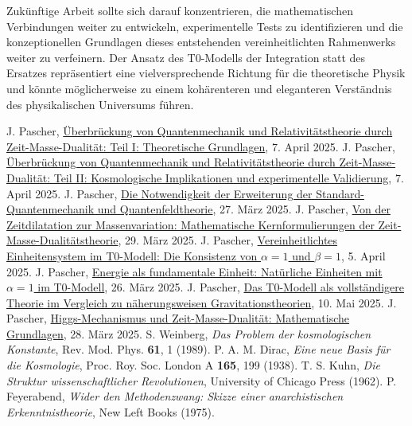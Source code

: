 \documentclass[12pt,a4paper]{article}
\begin{document}
	Zukünftige Arbeit sollte sich darauf konzentrieren, die mathematischen Verbindungen weiter zu entwickeln, experimentelle Tests zu identifizieren und die konzeptionellen Grundlagen dieses entstehenden vereinheitlichten Rahmenwerks weiter zu verfeinern. Der Ansatz des T0-Modells der Integration statt des Ersatzes repräsentiert eine vielversprechende Richtung für die theoretische Physik und könnte möglicherweise zu einem kohärenteren und eleganteren Verständnis des physikalischen Universums führen.
	
	\begin{thebibliography}{99}
		 J. Pascher, \href{https://github.com/jpascher/T0-Time-Mass-Duality/tree/main/2/pdf/Deutsch/QMRelTimeMassPart1.pdf}{Überbrückung von Quantenmechanik und Relativitätstheorie durch Zeit-Masse-Dualität: Teil I: Theoretische Grundlagen}, 7. April 2025.
		 J. Pascher, \href{https://github.com/jpascher/T0-Time-Mass-Duality/tree/main/2/pdf/Deutsch/QMRelTimeMassPart2.pdf}{Überbrückung von Quantenmechanik und Relativitätstheorie durch Zeit-Masse-Dualität: Teil II: Kosmologische Implikationen und experimentelle Validierung}, 7. April 2025.
		 J. Pascher, \href{https://github.com/jpascher/T0-Time-Mass-Duality/tree/main/2/pdf/Deutsch/NotwendigkeitQMErweiterung.pdf}{Die Notwendigkeit der Erweiterung der Standard-Quantenmechanik und Quantenfeldtheorie}, 27. März 2025.
		 J. Pascher, \href{https://github.com/jpascher/T0-Time-Mass-Duality/tree/main/2/pdf/Deutsch/MathZeitMasseLagrange.pdf}{Von der Zeitdilatation zur Massenvariation: Mathematische Kernformulierungen der Zeit-Masse-Dualitätstheorie}, 29. März 2025.
		 J. Pascher, \href{https://github.com/jpascher/T0-Time-Mass-Duality/tree/main/2/pdf/Deutsch/Alpha1Beta1Konsistenz.pdf}{Vereinheitlichtes Einheitensystem im T0-Modell: Die Konsistenz von $\alpha = 1$ und $\beta = 1$}, 5. April 2025.
		 J. Pascher, \href{https://github.com/jpascher/T0-Time-Mass-Duality/tree/main/2/pdf/Deutsch/NatEinheitenAlpha1.pdf}{Energie als fundamentale Einheit: Natürliche Einheiten mit $\alpha = 1$ im T0-Modell}, 26. März 2025.
		 J. Pascher, \href{https://github.com/jpascher/T0-Time-Mass-Duality/tree/main/2/pdf/Deutsch/T0-ModelAsCompleteTheory.pdf}{Das T0-Modell als vollständigere Theorie im Vergleich zu näherungsweisen Gravitationstheorien}, 10. Mai 2025.
		 J. Pascher, \href{https://github.com/jpascher/T0-Time-Mass-Duality/tree/main/2/pdf/Deutsch/MathHiggsZeitMasse.pdf}{Higgs-Mechanismus und Zeit-Masse-Dualität: Mathematische Grundlagen}, 28. März 2025.
		 S. Weinberg, \textit{Das Problem der kosmologischen Konstante}, Rev. Mod. Phys. \textbf{61}, 1 (1989).
		 P. A. M. Dirac, \textit{Eine neue Basis für die Kosmologie}, Proc. Roy. Soc. London A \textbf{165}, 199 (1938).
		 T. S. Kuhn, \textit{Die Struktur wissenschaftlicher Revolutionen}, University of Chicago Press (1962).
		 P. Feyerabend, \textit{Wider den Methodenzwang: Skizze einer anarchistischen Erkenntnistheorie}, New Left Books (1975).
	\end{thebibliography}
	
\end{document}

